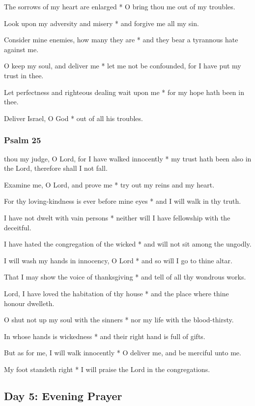 The sorrows of my heart are enlarged * O bring thou me out of my troubles.

Look upon my adversity and misery * and forgive me all my sin.

Consider mine enemies, how many they are * and they bear a tyrannous hate against me.

O keep my soul, and deliver me * let me not be confounded, for I have put my trust in thee.

Let perfectness and righteous dealing wait upon me * for my hope hath been in thee.

Deliver Israel, O God * out of all his troubles.

\subsubsection{Psalm 25}


 thou my judge, O Lord, for I have walked innocently * my trust hath been also in the Lord, therefore shall I not fall.

Examine me, O Lord, and prove me * try out my reins and my heart.

For thy loving-kindness is ever before mine eyes * and I will walk in thy truth.

I have not dwelt with vain persons * neither will I have fellowship with the deceitful.

I have hated the congregation of the wicked * and will not sit among the ungodly.

I will wash my hands in innocency, O Lord * and so will I go to thine altar.

That I may show the voice of thanksgiving * and tell of all thy wondrous works.

Lord, I have loved the habitation of thy house * and the place where thine honour dwelleth.

O shut not up my soul with the sinners * nor my life with the blood-thirsty.

In whose hands is wickedness * and their right hand is full of gifts.

But as for me, I will walk innocently * O deliver me, and be merciful unto me.

My foot standeth right * I will praise the Lord in the congregations.

\subsection{Day 5: Evening Prayer}

